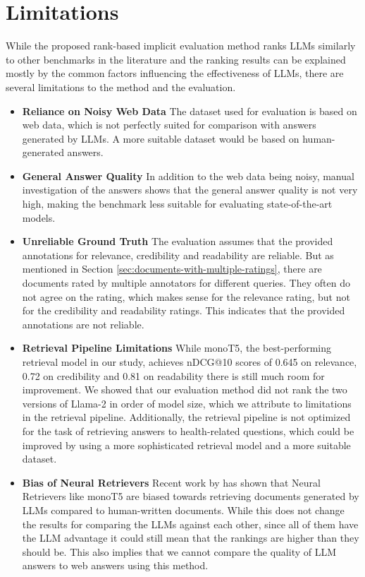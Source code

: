 \section{Limitations}
While the proposed rank-based implicit evaluation method ranks LLMs similarly to other benchmarks in the literature and the ranking results can be explained mostly by the common factors influencing the effectiveness of LLMs, there are several limitations to the method and the evaluation.


\begin{itemize}
    \item 	\textbf{Reliance on Noisy Web Data} The dataset used for evaluation is based on web data, which is not perfectly suited for comparison with answers generated by LLMs. A more suitable dataset would be based on human-generated answers.

    \item 	\textbf{General Answer Quality} In addition to the web data being noisy, manual investigation of the answers shows that the general answer quality is not very high, making the benchmark less suitable for evaluating state-of-the-art models.

    \item 	\textbf{Unreliable Ground Truth} The evaluation assumes that the provided annotations for relevance, credibility and readability are reliable. But as mentioned in Section \ref{sec:documents-with-multiple-ratings}, there are documents rated by multiple annotators for different queries. They often do not agree on the rating, which makes sense for the relevance rating, but not for the credibility and readability ratings. This indicates that the provided annotations are not reliable.

    \item 	\textbf{Retrieval Pipeline Limitations} While monoT5, the best-performing retrieval model in our study, achieves nDCG@10 scores of 0.645 on relevance, 0.72 on credibility and 0.81 on readability there is still much room for improvement. We showed that our evaluation method did not rank the two versions of Llama-2 in order of model size, which we attribute to limitations in the retrieval pipeline. Additionally, the retrieval pipeline is not optimized for the task of retrieving answers to health-related questions, which could be improved by using a more sophisticated retrieval model and a more suitable dataset.

    \item   \textbf{Bias of Neural Retrievers} Recent work by \cite{dai:2023:llms} has shown that Neural Retrievers like monoT5 are biased towards retrieving documents generated by LLMs compared to human-written documents. While this does not change the results for comparing the LLMs against each other, since all of them have the LLM advantage it could still mean that the rankings are higher than they should be. This also implies that we cannot compare the quality of LLM answers to web answers using this method.
\end{itemize}